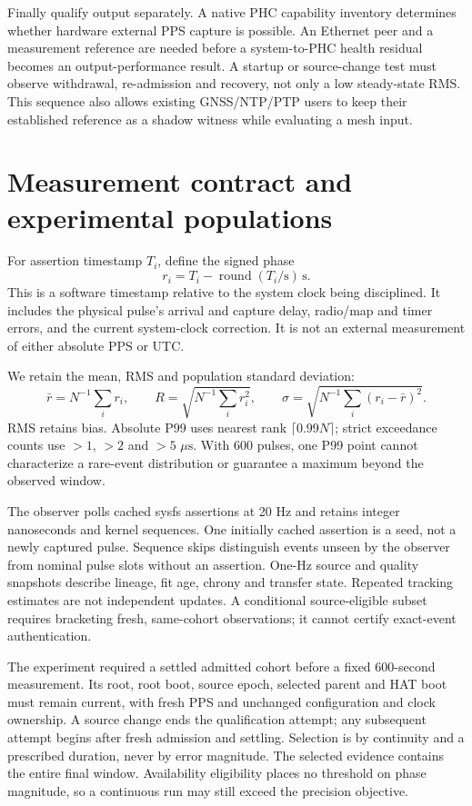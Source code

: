 \documentclass[10pt,letterpaper]{article}
\newcommand{\us}{\ensuremath{\mu\mathrm{s}}}
\begin{document}
Finally qualify output separately. A native PHC capability inventory determines
whether hardware external PPS capture is possible. An Ethernet peer and a
measurement reference are needed before a system-to-PHC health residual becomes
an output-performance result. A startup or source-change test must observe
withdrawal, re-admission and recovery, not only a low steady-state RMS. This
sequence also allows existing GNSS/NTP/PTP users to keep their established
reference as a shadow witness while evaluating a mesh input.

\section{Measurement contract and experimental populations}
For assertion timestamp \(T_i\), define the signed phase
\[
 r_i=T_i-\operatorname{round}(T_i/\mathrm{s})\,\mathrm{s}.
\]
This is a software timestamp relative to the system clock being disciplined.
It includes the physical pulse's arrival and capture delay, radio/map and
timer errors, and the current system-clock correction. It is not an external
measurement of either absolute PPS or UTC.

We retain the mean, RMS and population standard deviation:
\[
 \bar r=N^{-1}\sum_i r_i,\qquad
 R=\sqrt{N^{-1}\sum_i r_i^2},\qquad
 \sigma=\sqrt{N^{-1}\sum_i(r_i-\bar r)^2}.
\]
RMS retains bias. Absolute P99 uses nearest rank
\(\lceil0.99N\rceil\); strict exceedance counts use \(>1\), \(>2\) and
\(>5\) \us. With 600 pulses, one P99 point cannot characterize a rare-event
distribution or guarantee a maximum beyond the observed window.

The observer polls cached sysfs assertions at 20 Hz and retains integer
nanoseconds and kernel sequences. One initially cached assertion is a seed,
not a newly captured pulse. Sequence skips distinguish events unseen by the
observer from nominal pulse slots without an assertion. One-Hz source and
quality snapshots describe lineage, fit age, chrony and transfer state.
Repeated tracking estimates are not independent updates. A conditional
source-eligible subset requires bracketing fresh, same-cohort observations;
it cannot certify exact-event authentication.

The experiment required a settled admitted cohort before a fixed
600-second measurement. Its root, root boot, source epoch, selected parent and
HAT boot must remain current, with fresh PPS and unchanged configuration and
clock ownership. A source change ends the qualification attempt; any subsequent
attempt begins after fresh admission and settling. Selection is by continuity
and a prescribed duration, never by error magnitude. The selected evidence
contains the entire final window. Availability eligibility places no threshold
on phase magnitude, so a continuous run may still exceed the precision objective.
\end{document}
